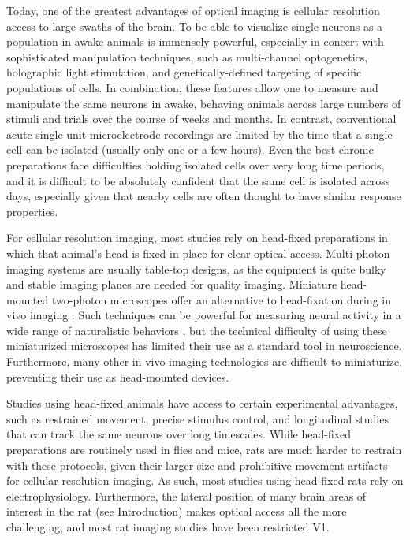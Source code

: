 Today, one of the greatest advantages of optical imaging is cellular resolution access to large swaths of the brain. To be able to visualize single neurons as a population in awake animals is immensely powerful, especially in concert with sophisticated manipulation techniques, such as multi-channel optogenetics, holographic light stimulation, and genetically-defined targeting of specific populations of cells. In combination, these features allow one to measure and manipulate the same neurons in awake, behaving animals across large numbers of stimuli and trials over the course of weeks and months. In contrast, conventional acute single-unit microelectrode recordings are limited by the time that a single cell can be isolated (usually only one or a few hours). Even the best chronic preparations face difficulties holding isolated cells over very long time periods, and it is difficult to be absolutely confident that the same cell is isolated across days, especially given that nearby cells are often thought to have similar response properties.

For cellular resolution imaging, most studies rely on head-fixed preparations in which that animal's head is fixed in place for clear optical access. Multi-photon imaging systems are usually table-top designs, as the equipment is quite bulky and stable imaging planes are needed for quality imaging. Miniature head-mounted two-photon microscopes offer an alternative to head-fixation during in vivo imaging \cite{Helmchen2001, Sawinski2009}. Such techniques can be powerful for measuring neural activity in a wide range of naturalistic behaviors \cite{Sawinski2009}, but the technical difficulty of using these miniaturized microscopes has limited their use as a standard tool in neuroscience\cite{Kerr2012}. Furthermore, many other in vivo imaging technologies are difficult to miniaturize, preventing their use as head-mounted devices. 

Studies using head-fixed animals have access to certain experimental advantages, such as restrained movement, precise stimulus control, and longitudinal studies that can track the same neurons over long timescales. While head-fixed preparations are routinely used in flies and mice, rats are much harder to restrain with these protocols, given their larger size and prohibitive movement artifacts for cellular-resolution imaging. As such, most studies using head-fixed rats rely on electrophysiology. Furthermore, the lateral position of many brain areas of interest in the rat (see Introduction) makes optical access all the more challenging, and most rat imaging studies have been restricted V1\cite{Greenberg2008, Ohki2005, Scott2018}.

